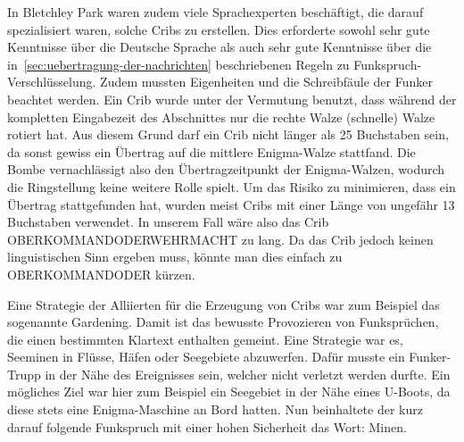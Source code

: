 In Bletchley Park waren zudem viele Sprachexperten beschäftigt, die darauf spezialisiert waren, solche Cribs zu erstellen.
Dies erforderte sowohl sehr gute Kenntnisse über die Deutsche Sprache als auch sehr gute Kenntnisse über die in~\cref{sec:uebertragung-der-nachrichten}
beschriebenen Regeln zu Funkspruch-Verschlüsselung.
Zudem mussten Eigenheiten und die \glqq Schreibfäule\grqq{} der Funker beachtet werden.
Ein Crib wurde unter der Vermutung benutzt, dass während der kompletten Eingabezeit des Abschnittes nur die rechte Walze (schnelle) Walze rotiert hat.
Aus diesem Grund darf ein Crib nicht länger als 25 Buchstaben sein, da sonst gewiss ein Übertrag auf die mittlere Enigma-Walze stattfand.
Die Bombe vernachlässigt also den Übertragzeitpunkt der Enigma-Walzen, wodurch die Ringstellung keine weitere Rolle spielt.
Um das Risiko zu minimieren, dass ein Übertrag stattgefunden hat, wurden meist Cribs mit einer Länge von ungefähr 13 Buchstaben verwendet.
In unserem Fall wäre also das Crib \glqq OBERKOMMANDODERWEHRMACHT\grqq{} zu lang.
Da das Crib jedoch keinen linguistischen Sinn ergeben muss, könnte man dies einfach zu \glqq OBERKOMMANDODER\grqq{} kürzen.

Eine Strategie der Alliierten für die Erzeugung von Cribs war zum Beispiel das sogenannte \glqq Gardening\grqq.
Damit ist das bewusste Provozieren von Funksprüchen, die einen bestimmten Klartext enthalten gemeint.
Eine Strategie war es, Seeminen in Flüsse, Häfen oder Seegebiete abzuwerfen.
Dafür musste ein Funker-Trupp in der Nähe des Ereignisses sein, welcher nicht verletzt werden durfte.
Ein mögliches Ziel war hier zum Beispiel ein Seegebiet in der Nähe eines U-Boots, da diese stets eine Enigma-Maschine an Bord hatten.
Nun beinhaltete der kurz darauf folgende Funkspruch mit einer hohen Sicherheit das Wort: \glqq Minen\grqq.

\newpage
